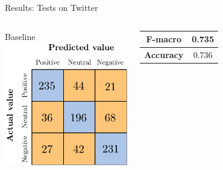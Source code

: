 \documentclass{beamer}
\begin{document}
	\begin{frame}{Results: Tests on Twitter}
		\begin{columns}
			\centering
			Baseline\vspace{0.7cm}\\
			\includegraphics[width=0.7\linewidth]{figures/twitter_snt_svm_tst.pdf}\\
			\begin{table}
				\centering
				\begin{tabular}{| c | c |}
					\hline
					\textbf{F-macro} & 0.735 \\
					\hline
					\textbf{Accuracy} & 0.736 \\
					\hline
				\end{tabular}
			\end{table}
			

\end{columns}
\end{frame}
\end{document}
